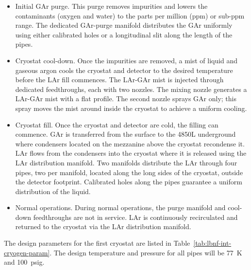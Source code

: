 \begin{itemize}
\item Initial GAr purge. This purge removes impurities and lowers the contaminants (oxygen and water) to the parts per million (ppm) or sub-ppm range. The dedicated GAr-purge manifold distributes the GAr uniformly using either calibrated holes or a longitudinal slit along the length of the pipes. 

\item Cryostat cool-down. Once the impurities are removed, a mist of liquid and gaseous argon cools the cryostat and detector to the desired temperature before the LAr fill commences. The LAr-GAr mist is injected through dedicated feedthroughs, each with two nozzles. The mixing nozzle generates a LAr-GAr mist with a flat profile. The second nozzle sprays GAr only; this spray moves the mist around inside the cryostat to achieve a uniform cooling.

\item Cryostat fill. Once the cryostat and detector are cold, the filling can commence. GAr is transferred from the surface to the 4850L underground where condensers located on the mezzanine above the cryostat recondense it. LAr flows from the condensers into the cryostat where it is released using the LAr distribution manifold. Two  manifolds distribute the LAr through four pipes, two per manifold, located along the long sides of the cryostat, outside the detector footprint. Calibrated holes along the pipes guarantee a uniform distribution of the liquid.

\item Normal operations. During normal operations, the purge manifold and cool-down feedthroughs are not in service. LAr is continuously recirculated and returned to the cryostat via the LAr distribution manifold.
\end{itemize}

The design parameters for the first cryostat are listed in Table~\ref{tab:lbnf-int-cryogen-param}. The design temperature and pressure for all pipes will be \SI{77}{K} and \SI{100}{psig}.

